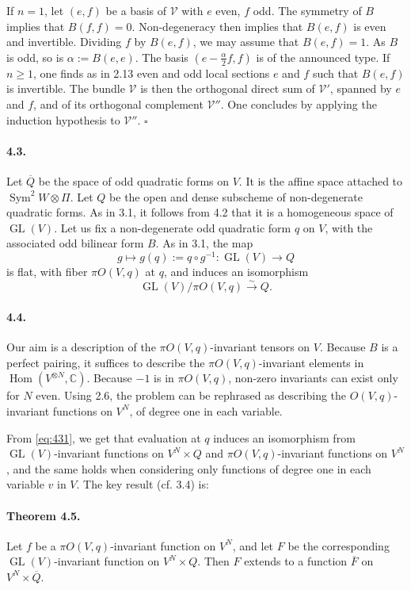 \documentclass[11pt]{article}
\newcommand{\C}{\mathbb C}
\newcommand{\Hom}{\operatorname{Hom}}
\newcommand{\GL}{\operatorname{GL}}
\newcommand{\Sym}{\operatorname{Sym}}
\newcommand{\barQ}{\overline Q}
\begin{document}
If $n=1$, let $(e,f)$ be a basis of $\mathcal V$ with $e$ even, $f$ odd. The symmetry of $B$ implies that $B(f,f)=0$. Non-degeneracy then implies that $B(e,f)$ is even and invertible. Dividing $f$ by $B(e,f)$, we may assume that $B(e,f)=1$. As $B$ is odd, so is $\alpha:=B(e,e)$. The basis $(e-\frac{\alpha}{2}f,f)$ is of the announced type. If $n\ge1$, one finds as in 2.13 even and odd local sections $e$ and $f$ such that $B(e,f)$ is invertible. The bundle $\mathcal V$ is then the orthogonal direct sum of $\mathcal V'$, spanned by $e$ and $f$, and of its orthogonal complement $\mathcal V''$. One concludes by applying the induction hypothesis to $\mathcal V''$. \hfill $\square$

\paragraph{4.3.}
Let $\barQ$ be the space of odd quadratic forms on $V$. It is the affine space attached to $\Sym^2W\otimes\Pi$. Let $Q$ be the open and dense subscheme of non-degenerate quadratic forms. As in 3.1, it follows from 4.2 that it is a homogeneous space of $\GL(V)$. Let us fix a non-degenerate odd quadratic form $q$ on $V$, with the associated odd bilinear form $B$. As in 3.1, the map
\[
g\longmapsto g(q):=q\circ g^{-1}:\GL(V)\longrightarrow Q
\]
is flat, with fiber $\pi O(V,q)$ at $q$, and induces an isomorphism
\begin{equation}
\label{eq:431}
\GL(V)/\pi O(V,q)\xrightarrow{\sim}Q.
\end{equation}

\paragraph{4.4.}
Our aim is a description of the $\pi O(V,q)$-invariant tensors on $V$. Because $B$ is a perfect pairing, it suffices to describe the $\pi O(V,q)$-invariant elements in $\Hom(V^{\otimes N},\C)$. Because $-1$ is in $\pi O(V,q)$, non-zero invariants can exist only for $N$ even. Using 2.6, the problem can be rephrased as describing the $O(V,q)$-invariant functions on $V^N$, of degree one in each variable.

From \eqref{eq:431}, we get that evaluation at $q$ induces an isomorphism from $\GL(V)$-invariant functions on $V^N\times Q$ and $\pi O(V,q)$-invariant functions on $V^N$, and the same holds when considering only functions of degree one in each variable $v$ in $V$. The key result (cf. 3.4) is:

\paragraph{Theorem 4.5.}
Let $f$ be a $\pi O(V,q)$-invariant function on $V^N$, and let $F$ be the corresponding $\GL(V)$-invariant function on $V^N\times Q$. Then $F$ extends to a function $\overline F$ on $V^N\times\barQ$.
\end{document}
